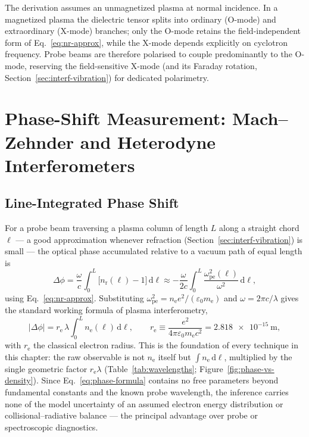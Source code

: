 The derivation assumes an unmagnetized plasma at normal incidence. In a magnetized plasma the dielectric tensor splits into ordinary (O-mode) and extraordinary (X-mode) branches; only the O-mode retains the field-independent form of Eq.~\eqref{eq:nr-approx}, while the X-mode depends explicitly on cyclotron frequency. Probe beams are therefore polarised to couple predominantly to the O-mode, reserving the field-sensitive X-mode (and its Faraday rotation, Section~\ref{sec:interf-vibration}) for dedicated polarimetry.

\section{Phase-Shift Measurement: Mach--Zehnder and Heterodyne Interferometers}
\label{sec:interf-phase}

\subsection{Line-Integrated Phase Shift}

For a probe beam traversing a plasma column of length $L$ along a straight chord $\ell$ — a good approximation whenever refraction (Section~\ref{sec:interf-vibration}) is small — the optical phase accumulated relative to a vacuum path of equal length is
\begin{equation}
\Delta\phi = \frac{\omega}{c}\int_{0}^{L}\bigl[n_{\mathrm{r}}(\ell) - 1\bigr]\,\mathrm{d}\ell
\approx -\frac{\omega}{2c}\int_{0}^{L}\frac{\omega_{\mathrm{pe}}^{2}(\ell)}{\omega^{2}}\,\mathrm{d}\ell,
\label{eq:phase-integral}
\end{equation}
using Eq.~\eqref{eq:nr-approx}. Substituting $\omega_{\mathrm{pe}}^{2}=n_{\mathrm{e}}e^{2}/(\varepsilon_{0}m_{\mathrm{e}})$ and $\omega = 2\pi c/\lambda$ gives the standard working formula of plasma interferometry,
\begin{equation}
|\Delta\phi| = r_{\mathrm{e}}\,\lambda \int_{0}^{L} n_{\mathrm{e}}(\ell)\,\mathrm{d}\ell,
\qquad
r_{\mathrm{e}} \equiv \frac{e^{2}}{4\pi\varepsilon_{0} m_{\mathrm{e}} c^{2}} = \SI{2.818e-15}{\meter},
\label{eq:phase-formula}
\end{equation}
with $r_{\mathrm{e}}$ the classical electron radius. This is the foundation of every technique in this chapter: the raw observable is not $n_{\mathrm{e}}$ itself but $\int n_{\mathrm{e}}\,\mathrm{d}\ell$, multiplied by the single geometric factor $r_{\mathrm{e}}\lambda$ (Table~\ref{tab:wavelengths}; Figure~\ref{fig:phase-vs-density}). Since Eq.~\eqref{eq:phase-formula} contains no free parameters beyond fundamental constants and the known probe wavelength, the inference carries none of the model uncertainty of an assumed electron energy distribution or collisional--radiative balance — the principal advantage over probe or spectroscopic diagnostics.

